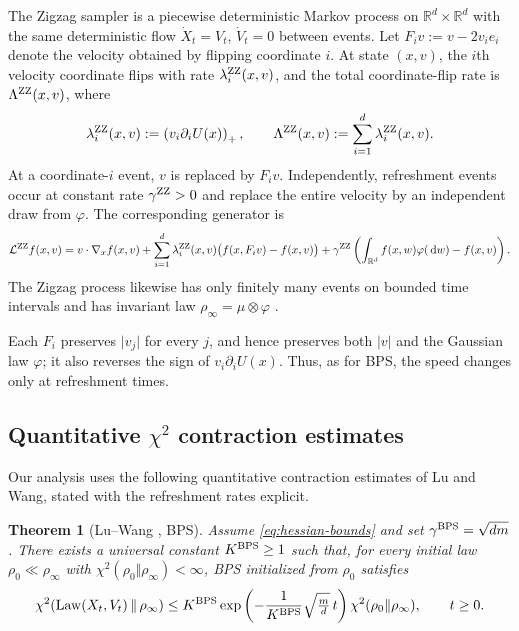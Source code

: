 \documentclass{amsart}
\theoremstyle{plain}
\newtheorem{theorem}{Theorem}
\theoremstyle{definition}
\theoremstyle{remark}
\newcommand{\ud}{\,\mathrm{d}}
\newcommand{\RR}{\mathbb{R}}
\newcommand{\abs}[1]{\lvert#1\rvert}
\newcommand{\R}{\RR}
\newcommand{\1}{\mathbf 1}
\newcommand{\dd}{\ud}
\newcommand{\pos}[1]{\left(#1\right)_+}
\DeclareMathOperator{\Law}{Law}
\newcommand{\bps}{{\rm BPS}}
\newcommand{\zz}{{\rm ZZ}}
\begin{document}
The Zigzag sampler is a piecewise deterministic Markov process on
$\R^d\times\R^d$ with the same deterministic flow
$\dot X_t=V_t$, $\dot V_t=0$ between events.  Let
$F_i v:=v-2v_i e_i$ denote the velocity obtained by flipping coordinate $i$.
At state $(x,v)$, the $i$th velocity coordinate flips with rate $\lambda_i^{\zz}(x,v)$, and the total coordinate-flip rate is
$\Lambda^{\zz}(x,v)$, where
\begin{equation}\label{eq:zz-rates}
\lambda_i^{\zz}(x,v):=\pos{v_i\partial_iU(x)},
\qquad
\Lambda^{\zz}(x,v):=\sum_{i=1}^d\lambda_i^{\zz}(x,v).
\end{equation}
At a coordinate-$i$ event, $v$ is replaced by $F_i v$.  Independently,
refreshment events occur at constant rate $\gamma^{\zz}>0$ and replace the
entire velocity by an independent draw from $\varphi$.  The corresponding
generator is
\begin{equation}\label{eq:zz-generator}
\mathcal L^{\zz}f(x,v)
=
v\cdot\nabla_xf(x,v)
+
\sum_{i=1}^d\lambda_i^{\zz}(x,v)
\bigl(f(x,F_i v)-f(x,v)\bigr)
+
\gamma^{\zz}\left(
  \int_{\R^d}f(x,w)\varphi(\dd w)-f(x,v)
\right).
\end{equation}
The Zigzag process likewise has only finitely many events on bounded time
intervals and has invariant law $\rho_\infty=\mu\otimes\varphi$
\cite{BierkensFearnheadRoberts,LuWangZigzag}.

Each $F_i$ preserves $\abs{v_j}$ for every $j$, and hence preserves both
$\abs v$ and the Gaussian law $\varphi$; it also reverses the sign of
$v_i\partial_iU(x)$.  Thus, as for BPS, the speed changes only at refreshment
times.  

\subsection{Quantitative \texorpdfstring{$\chi^2$}{chi-square} contraction estimates}\label{ssec:LW}

Our analysis uses the following quantitative contraction estimates of Lu and
Wang, stated with the refreshment rates explicit.

\begin{theorem}[Lu--Wang \cite{LuWangPDMP}, BPS]\label{thm:LW}
Assume \eqref{eq:hessian-bounds} and set $\gamma^{\bps}=\sqrt{dm}$.
There exists a universal constant $K^{\bps}\ge1$ such that, for every initial
law $\rho_0\ll\rho_\infty$ with
$\chi^2(\rho_0\Vert\rho_\infty)<\infty$, BPS initialized from $\rho_0$
satisfies
\begin{equation}\label{eq:LW-L2}
        \chi^2\!\left(
          \Law(X_t,V_t)\,\middle\Vert\,\rho_\infty
        \right)
        \le K^{\bps}
        \exp\left(-\frac{1}{K^{\bps}}\sqrt{\tfrac md}\,t\right)
        \chi^2(\rho_0\Vert\rho_\infty),
        \qquad t\ge0 .
\end{equation}
\end{theorem}
\end{document}
